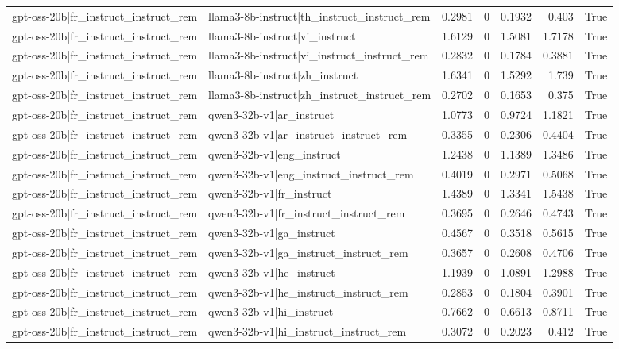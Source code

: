 \begin{table}
\begin{tabular}{l l r r r r l}
gpt-oss-20b|fr_instruct_instruct_rem & llama3-8b-instruct|th_instruct_instruct_rem & 0.2981 & 0 & 0.1932 & 0.403 & True \\
gpt-oss-20b|fr_instruct_instruct_rem & llama3-8b-instruct|vi_instruct & 1.6129 & 0 & 1.5081 & 1.7178 & True \\
gpt-oss-20b|fr_instruct_instruct_rem & llama3-8b-instruct|vi_instruct_instruct_rem & 0.2832 & 0 & 0.1784 & 0.3881 & True \\
gpt-oss-20b|fr_instruct_instruct_rem & llama3-8b-instruct|zh_instruct & 1.6341 & 0 & 1.5292 & 1.739 & True \\
gpt-oss-20b|fr_instruct_instruct_rem & llama3-8b-instruct|zh_instruct_instruct_rem & 0.2702 & 0 & 0.1653 & 0.375 & True \\
gpt-oss-20b|fr_instruct_instruct_rem & qwen3-32b-v1|ar_instruct & 1.0773 & 0 & 0.9724 & 1.1821 & True \\
gpt-oss-20b|fr_instruct_instruct_rem & qwen3-32b-v1|ar_instruct_instruct_rem & 0.3355 & 0 & 0.2306 & 0.4404 & True \\
gpt-oss-20b|fr_instruct_instruct_rem & qwen3-32b-v1|eng_instruct & 1.2438 & 0 & 1.1389 & 1.3486 & True \\
gpt-oss-20b|fr_instruct_instruct_rem & qwen3-32b-v1|eng_instruct_instruct_rem & 0.4019 & 0 & 0.2971 & 0.5068 & True \\
gpt-oss-20b|fr_instruct_instruct_rem & qwen3-32b-v1|fr_instruct & 1.4389 & 0 & 1.3341 & 1.5438 & True \\
gpt-oss-20b|fr_instruct_instruct_rem & qwen3-32b-v1|fr_instruct_instruct_rem & 0.3695 & 0 & 0.2646 & 0.4743 & True \\
gpt-oss-20b|fr_instruct_instruct_rem & qwen3-32b-v1|ga_instruct & 0.4567 & 0 & 0.3518 & 0.5615 & True \\
gpt-oss-20b|fr_instruct_instruct_rem & qwen3-32b-v1|ga_instruct_instruct_rem & 0.3657 & 0 & 0.2608 & 0.4706 & True \\
gpt-oss-20b|fr_instruct_instruct_rem & qwen3-32b-v1|he_instruct & 1.1939 & 0 & 1.0891 & 1.2988 & True \\
gpt-oss-20b|fr_instruct_instruct_rem & qwen3-32b-v1|he_instruct_instruct_rem & 0.2853 & 0 & 0.1804 & 0.3901 & True \\
gpt-oss-20b|fr_instruct_instruct_rem & qwen3-32b-v1|hi_instruct & 0.7662 & 0 & 0.6613 & 0.8711 & True \\
gpt-oss-20b|fr_instruct_instruct_rem & qwen3-32b-v1|hi_instruct_instruct_rem & 0.3072 & 0 & 0.2023 & 0.412 & True \\

\end{tabular}
\end{table}
